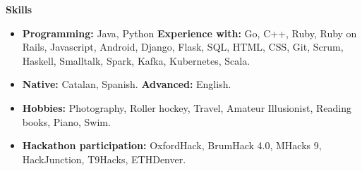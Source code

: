 \documentclass[letterpaper,10pt]{article}
\newcommand{\resitem}[1]{\item #1 \vspace{-2pt}}
\newcommand{\resheading}[1]{{\large \colorbox{mygrey}{\begin{minipage}{\textwidth}{\textbf{#1 \vphantom{p\^{E}}}}\end{minipage}}}}
\begin{document}
\resheading{Skills}
	\begin{itemize}
		\resitem{\textbf{Programming:} Java, Python \textbf{Experience with:}  Go, C++, Ruby, Ruby on Rails, Javascript, Android, Django, Flask, SQL, HTML, CSS, Git, Scrum, Haskell, Smalltalk, Spark, Kafka, Kubernetes, Scala.}
		\resitem{\textbf{Native:} Catalan, Spanish. \textbf{Advanced:} English.}
		\resitem{\textbf{Hobbies:} Photography, Roller hockey, Travel, Amateur Illusionist, Reading books, Piano, Swim.}
		\resitem{\textbf{Hackathon participation:} OxfordHack, BrumHack 4.0, MHacks 9, HackJunction, T9Hacks, ETHDenver.}
	\end{itemize}
\end{document}
